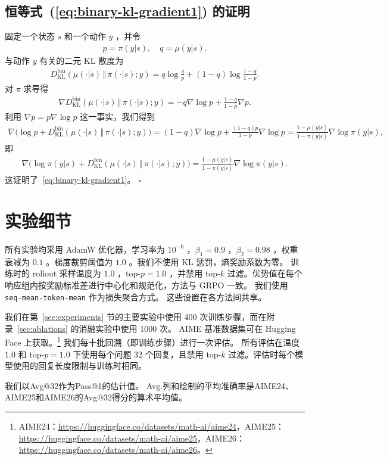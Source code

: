 \documentclass[11pt]{article}
\theoremstyle{definition}
\def\eq#1{\begin{equation*}\begin{split}#1\end{split}\end{equation*}}
\def\pr#1{\left( #1 \right ) }
\newcommand\na{\nabla}
\def\prB#1{\Big( #1 \Big)}
\begin{document}
\begin{appendices}
\subsection{恒等式~(\ref{eq:binary-kl-gradient1}) 的证明}\label{sec:proof-binary-kl-gradient}
固定一个状态 $s$ 和一个动作 $y$ ，并令  
\eq{
    p = \pi(y | s),\quad q = \mu(y | s).
}  
与动作 $y$ 有关的二元 KL 散度为  
\eq{
    D^{\mathrm{bin}}_{\mathrm{KL}}\pr{\mu(\cdot | s) \,\Vert\, \pi(\cdot | s); y}= q\log\frac{q}{p} + (1 - q)\log\frac{1 - q}{1 - p}.
}  
对 $\pi$ 求导得  
\eq{
    \na D^{\mathrm{bin}}_{\mathrm{KL}}\pr{\mu(\cdot | s) \,\Vert\, \pi(\cdot | s); y}= -q\na\log p + \frac{1 - q}{1 - p}\na p.
}  
利用 $\na p = p\na\log p$ 这一事实，我们得到  
\eq{
    \na\prB{\log p + D^{\mathrm{bin}}_{\mathrm{KL}}\pr{\mu(\cdot | s) \,\Vert\, \pi(\cdot | s); y}}= (1 - q)\na\log p + \frac{(1 - q)p}{1 - p}\na\log p
    = \frac{1 - \mu(y | s)}{1 - \pi(y | s)}\na\log\pi(y | s),                 
}  
即  
\eq{
    \na\prB{\log\pi(y | s) + D^{\mathrm{bin}}_{\mathrm{KL}}\pr{\mu(\cdot | s) \,\Vert\, \pi(\cdot | s); y}}= \frac{1 - \mu(y | s)}{1 - \pi(y | s)}\na\log\pi(y | s).
}  
这证明了~\eqref{eq:binary-kl-gradient1}。  
\hfill $\square$

\section{实验细节}\label{sec:experimentdetails}

所有实验均采用 AdamW 优化器，学习率为 $10^{-6}$ ，$\beta_1=0.9$ ，$\beta_2=0.98$ ，权重衰减为 $0.1$ 。梯度裁剪阈值为 $1.0$ 。我们不使用 KL 惩罚，熵奖励系数为零。  
训练时的 rollout 采样温度为 $1.0$ ，top-$p=1.0$ ，并禁用 top-$k$ 过滤。优势值在每个响应组内按奖励标准差进行中心化和规范化，方法与 GRPO 一致。  
我们使用 \texttt{seq-mean-token-mean} 作为损失聚合方式。  
这些设置在各方法间共享。

我们在第~\ref{sec:experiments} 节的主要实验中使用 400 次训练步骤，而在附录~\ref{sec:ablations} 的消融实验中使用 1000 次。  
AIME 基准数据集可在 Hugging Face 上获取。\footnote{AIME24：\url{https://huggingface.co/datasets/math-ai/aime24}，AIME25：\url{https://huggingface.co/datasets/math-ai/aime25}，AIME26：\url{https://huggingface.co/datasets/math-ai/aime26}。} 我们每十批回溯（即训练步骤）进行一次评估。  
所有评估在温度 $1.0$ 和 top-$p=1.0$ 下使用每个问题 32 个回复，且禁用 top-$k$ 过滤。评估时每个模型使用的回复长度限制与训练时相同。

我们以Avg@32作为Pass@1的估计值。  
Avg.列和绘制的平均准确率是AIME24、AIME25和AIME26的Avg@32得分的算术平均值。


\end{appendices}
\end{document}
